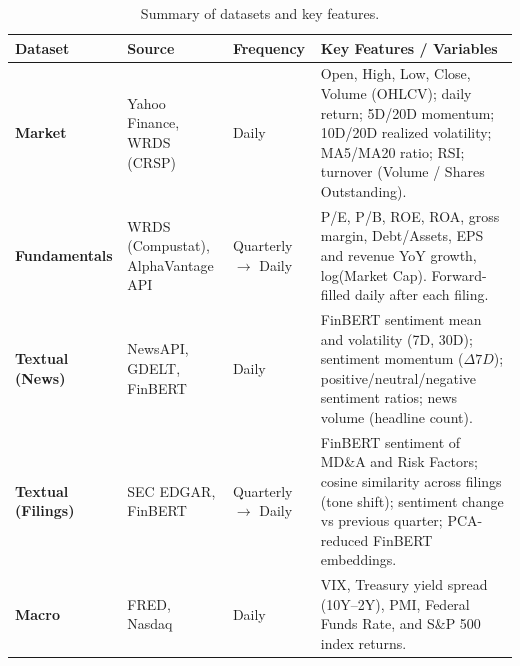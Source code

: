 \documentclass[11pt]{article}
\begin{document}
\begin{table}[htbp]
\centering
\caption{Summary of datasets and key features.}
\label{tab:data_summary}
\renewcommand{\arraystretch}{1.15}
\setlength{\tabcolsep}{4pt}
\begin{tabular}{p{2.7cm} p{3.2cm} p{2.2cm} p{6.5cm}}
\toprule
\textbf{Dataset} & \textbf{Source} & \textbf{Frequency} & \textbf{Key Features / Variables} \\
\midrule

\textbf{Market} &
Yahoo Finance, WRDS (CRSP) &
Daily &
Open, High, Low, Close, Volume (OHLCV); daily return; 5D/20D momentum; 10D/20D realized volatility; MA5/MA20 ratio; RSI; turnover (Volume / Shares Outstanding). \\[0.5em]

\textbf{Fundamentals} &
WRDS (Compustat), AlphaVantage API &
Quarterly $\rightarrow$ Daily &
P/E, P/B, ROE, ROA, gross margin, Debt/Assets, EPS and revenue YoY growth, log(Market Cap). Forward-filled daily after each filing. \\[0.5em]

\textbf{Textual (News)} &
NewsAPI, GDELT, FinBERT &
Daily &
FinBERT sentiment mean and volatility (7D, 30D); sentiment momentum ($\Delta7D$); positive/neutral/negative sentiment ratios; news volume (headline count). \\[0.5em]

\textbf{Textual (Filings)} &
SEC EDGAR, FinBERT &
Quarterly $\rightarrow$ Daily &
FinBERT sentiment of MD\&A and Risk Factors; cosine similarity across filings (tone shift); sentiment change vs previous quarter; PCA-reduced FinBERT embeddings. \\[0.5em]

\textbf{Macro} &
FRED, Nasdaq &
Daily &
VIX, Treasury yield spread (10Y–2Y), PMI, Federal Funds Rate, and S\&P 500 index returns. \\

\bottomrule
\end{tabular}
\end{table}
\end{document}
